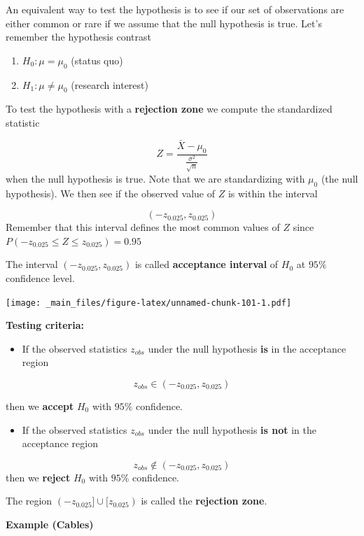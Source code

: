 \documentclass[
]{book}
\providecommand{\tightlist}{%
  \setlength{\itemsep}{0pt}\setlength{\parskip}{0pt}}
\begin{document}
An equivalent way to test the hypothesis is to see if our set of observations are either common or rare if we assume that the null hypothesis is true. Let's remember the hypothesis contrast

\begin{enumerate}
\def\labelenumi{\alph{enumi}.}
\tightlist
\item
  \(H_0:\mu = \mu_0\) (status quo)
\item
  \(H_1:\mu \neq \mu_0\) (research interest)
\end{enumerate}

To test the hypothesis with a \textbf{rejection zone} we compute the standardized statistic

\[Z=\frac{\bar{X}-\mu_0}{\frac{\sigma^2}{\sqrt{n}}}\]
when the null hypothesis is true. Note that we are standardizing with \(\mu_0\) (the null hypothesis). We then see if the observed value of \(Z\) is within the interval

\[(-z_{0.025}, z_{0.025})\]
Remember that this interval defines the most common values of \(Z\) since \(P(-z_{0.025} \leq Z \leq z_{0.025})=0.95\)

The interval \((-z_{0.025}, z_{0.025})\) is called \textbf{acceptance interval} of \(H_0\) at \(95\%\) confidence level.

\texttt{[image: \_main\_files/figure-latex/unnamed-chunk-101-1.pdf]}

\textbf{Testing criteria:}

\begin{itemize}
\tightlist
\item
  If the observed statistics \(z_{obs}\) under the null hypothesis \textbf{is} in the acceptance region
\end{itemize}

\[z_{obs} \in (-z_{0.025}, z_{0.025})\]

then we \textbf{accept} \(H_0\) with \(95\%\) confidence.

\begin{itemize}
\tightlist
\item
  If the observed statistics \(z_{obs}\) under the null hypothesis \textbf{is not} in the acceptance region
\end{itemize}

\[z_{obs} \notin (-z_{0.025}, z_{0.025})\] then we \textbf{reject} \(H_0\) with \(95\%\) confidence.

The region \((-z_{0.025}] \cup[z_{0.025})\) is called the \textbf{rejection zone}.

\textbf{Example (Cables)}
\end{document}
